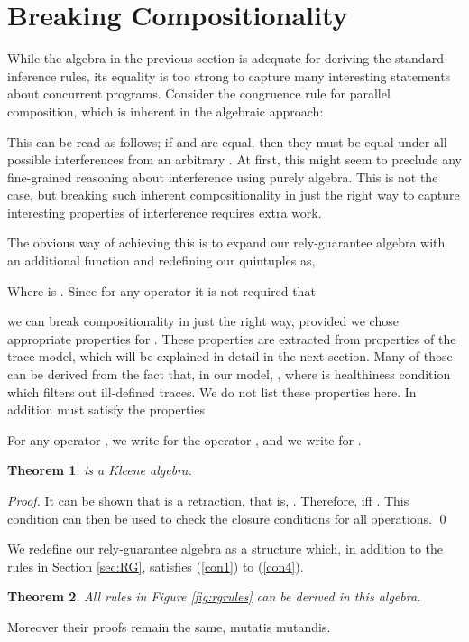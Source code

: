 \documentclass{llncs}
\newtheorem{thm}{Theorem}
\begin{document}
\section{Breaking Compositionality}
\label{sec:INT}

While the algebra in the previous section is adequate for deriving the
standard inference rules, its equality is too strong to capture many
interesting statements about concurrent programs. Consider the
congruence rule for parallel composition, which is inherent in the
algebraic approach:

This can be read as follows; if  and  are equal, then they must
be equal under all possible interferences from an arbitrary . At
first, this might seem to preclude any fine-grained reasoning about
interference using purely algebra. This is not the case, but breaking
such inherent compositionality in just the right way to capture
interesting properties of interference requires extra work.

The obvious way of achieving this is to expand our rely-guarantee
algebra with an additional function  and redefining our
quintuples as,

Where  is . Since for any operator
 it is not required that

we can break compositionality in just the right way, provided we chose
appropriate properties for . These properties are extracted from
properties of the trace model, which will be explained in detail in
the next section. Many of those can be derived from the fact that, in
our model, , where  is healthiness
condition which filters out ill-defined traces. We do not list these
properties here. In addition  must satisfy the properties


For any operator , we write  for the
operator , and we write  for
.
\begin{thm}
 is a Kleene algebra.
\end{thm}
\begin{proof}
  It can be shown that  is a retraction, that is, . Therefore,  iff . This condition can
  then be used to check the closure conditions for all operations. \qed
\end{proof}

We redefine our rely-guarantee algebra as a structure
 which, in addition
to the rules in Section \ref{sec:RG}, satisfies (\ref{con1}) to
(\ref{con4}).
\begin{thm}
  All rules in Figure \ref{fig:rgrules} can be derived in this
  algebra.
\end{thm}
Moreover their proofs remain the same, mutatis mutandis.
\end{document}
